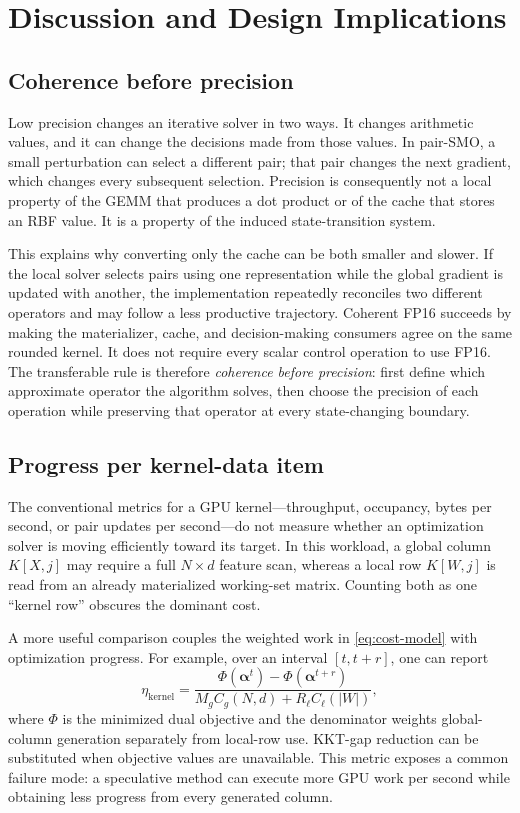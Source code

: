 \section{Discussion and Design Implications}

\subsection{Coherence before precision}

Low precision changes an iterative solver in two ways. It changes arithmetic
values, and it can change the decisions made from those values. In pair-SMO,
a small perturbation can select a different pair; that pair changes the next
gradient, which changes every subsequent selection. Precision is consequently
not a local property of the GEMM that produces a dot product or of the cache
that stores an RBF value. It is a property of the induced state-transition
system.

This explains why converting only the cache can be both smaller and slower.
If the local solver selects pairs using one representation while the global
gradient is updated with another, the implementation repeatedly reconciles
two different operators and may follow a less productive trajectory. Coherent
FP16 succeeds by making the materializer, cache, and decision-making consumers
agree on the same rounded kernel. It does not require every scalar control
operation to use FP16. The transferable rule is therefore
\emph{coherence before precision}: first define which approximate operator the
algorithm solves, then choose the precision of each operation while preserving
that operator at every state-changing boundary.

\subsection{Progress per kernel-data item}

The conventional metrics for a GPU kernel---throughput, occupancy, bytes per
second, or pair updates per second---do not measure whether an optimization
solver is moving efficiently toward its target. In this workload, a global
column $K[X,j]$ may require a full $N\times d$ feature scan, whereas a local
row $K[W,j]$ is read from an already materialized working-set matrix. Counting
both as one ``kernel row'' obscures the dominant cost.

A more useful comparison couples the weighted work in
\cref{eq:cost-model} with optimization progress. For example, over an interval
$[t,t+r]$, one can report
\begin{equation}
  \eta_{\mathrm{kernel}}
  =
  \frac{\Phi(\bm{\alpha}^{t})-\Phi(\bm{\alpha}^{t+r})}
       {M_g C_g(N,d)+R_\ell C_\ell(|W|)},
  \label{eq:progress-per-kernel-data}
\end{equation}
where $\Phi$ is the minimized dual objective and the denominator weights
global-column generation separately from local-row use. KKT-gap reduction can
be substituted when objective values are unavailable. This metric exposes a
common failure mode: a speculative method can execute more GPU work per
second while obtaining less progress from every generated column.

